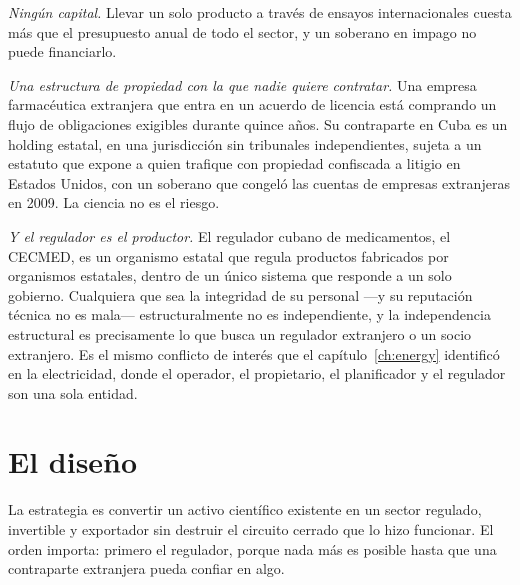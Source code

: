 \emph{Ningún capital.} Llevar un solo producto a través de ensayos internacionales cuesta más
que el presupuesto anual de todo el sector, y un soberano en impago no puede financiarlo.

\emph{Una estructura de propiedad con la que nadie quiere contratar.} Una empresa
farmacéutica extranjera que entra en un acuerdo de licencia está comprando un flujo de
obligaciones exigibles durante quince años. Su contraparte en Cuba es un holding estatal, en
una jurisdicción sin tribunales independientes, sujeta a un estatuto que expone a quien
trafique con propiedad confiscada a litigio en Estados Unidos, con un soberano que congeló
las cuentas de empresas extranjeras en 2009. La ciencia no es el riesgo.

\emph{Y el regulador es el productor.} El regulador cubano de medicamentos, el CECMED, es un
organismo estatal que regula productos fabricados por organismos estatales, dentro de un
único sistema que responde a un solo gobierno. Cualquiera que sea la integridad de su
personal ---y su reputación técnica no es mala--- estructuralmente no es independiente, y la
independencia estructural es precisamente lo que busca un regulador extranjero o un socio
extranjero. Es el mismo conflicto de interés que el capítulo~\ref{ch:energy} identificó en la
electricidad, donde el operador, el propietario, el planificador y el regulador son una sola
entidad.

\section{El diseño}

La estrategia es convertir un activo científico existente en un sector regulado, invertible y
exportador sin destruir el circuito cerrado que lo hizo funcionar. El orden importa: primero
el regulador, porque nada más es posible hasta que una contraparte extranjera pueda confiar en
algo.

